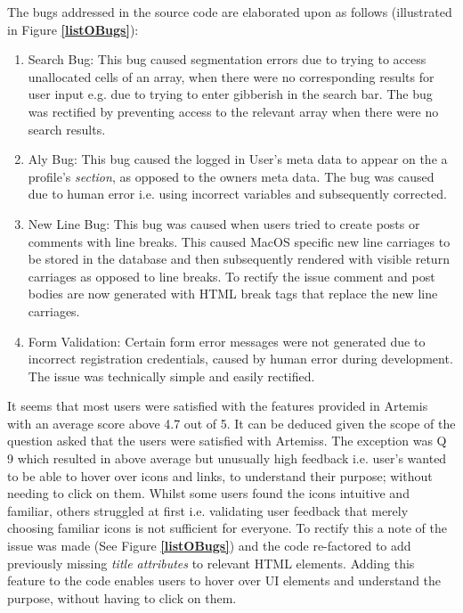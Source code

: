     The bugs addressed in the source code are elaborated upon as follows (illustrated in Figure \textbf{\ref{listOBugs}}):
    \begin{enumerate}
    
        \item Search Bug: This bug caused segmentation errors due to trying to access unallocated cells of an array, when there were no corresponding results for user input e.g. due to trying to enter gibberish in the search bar. The bug was rectified by preventing access to the relevant array when there were no search results.
        
        \item Aly Bug: This bug caused the logged in User's meta data to appear on the a profile's \textit{section}, as opposed to the owner\textquotesingle s meta data. The bug was caused due to human error i.e. using incorrect variables and subsequently corrected.
        
        \item New Line Bug: This bug was caused when user\textquotesingle s tried to create posts or comments with line breaks. This caused MacOS specific new line carriages to be stored in the database and then subsequently rendered with visible return carriages as opposed to line breaks. To rectify the issue comment and post bodies are now generated with HTML break tags that replace the new line carriages.
        
        \item Form Validation: Certain form error messages were not generated due to incorrect registration credentials, caused by human error during development. The issue was technically simple and easily rectified.
    
    \end{enumerate}
    
    It seems that most users were satisfied with the features provided in Artemis with an average score above 4.7 out of 5. It can be deduced given the scope of the question asked that the users were satisfied with Artemis\textquotesingle s. The exception was Q 9 which resulted in above average but unusually high  feedback i.e. user's wanted to be able to hover over icons and links, to understand their purpose; without needing to click on them. Whilst some users found the icons intuitive and familiar, others struggled at first i.e. validating user feedback that merely choosing familiar icons is not sufficient for everyone. To rectify this a note of the issue was made (See Figure \textbf{\ref{listOBugs}}) and the code re-factored to add previously missing \textit{title attributes} to relevant HTML elements. Adding this feature to the code enables users to hover over UI elements and understand the purpose, without having to click on them.
    

